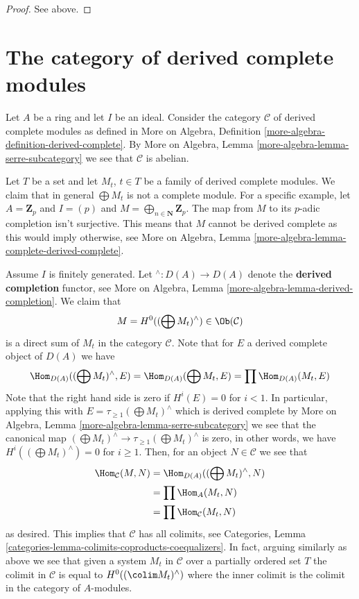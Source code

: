 \begin{proof}
See above.
\end{proof}





\section{The category of derived complete modules}
\label{section-derived-complete-modules}

\noindent
Let $A$ be a ring and let $I$ be an ideal. Consider the category
$\mathcal{C}$ of derived complete modules as defined in
More on Algebra, Definition \ref{more-algebra-definition-derived-complete}.
By More on Algebra, Lemma \ref{more-algebra-lemma-serre-subcategory}
we see that $\mathcal{C}$ is abelian.

\medskip\noindent
Let $T$ be a set and let $M_t$, $t \in T$ be a family of derived complete
modules. We claim that in general $\bigoplus M_t$ is not a complete module.
For a specific example, let $A = \mathbf{Z}_p$ and $I = (p)$ and
$M = \bigoplus_{n \in \mathbf{N}} \mathbf{Z}_p$. The map from
$M$ to its $p$-adic completion isn't surjective. This means that $M$
cannot be derived complete as this would imply otherwise, see
More on Algebra, Lemma \ref{more-algebra-lemma-complete-derived-complete}.

\medskip\noindent
Assume $I$ is finitely generated. Let ${}^\wedge : D(A) \to D(A)$ denote
the {\bf derived completion} functor, see
More on Algebra, Lemma \ref{more-algebra-lemma-derived-completion}.
We claim that
$$
M = H^0((\bigoplus M_t)^\wedge) \in \Ob(\mathcal{C})
$$
is a direct sum of $M_t$ in the category $\mathcal{C}$. Note that
for $E$ a derived complete object of $D(A)$ we have
$$
\Hom_{D(A)}((\bigoplus M_t)^\wedge, E) =
\Hom_{D(A)}(\bigoplus M_t, E) =
\prod \Hom_{D(A)}(M_t, E)
$$
Note that the right hand side is zero if $H^i(E) = 0$ for $i < 1$.
In particular, applying this with $E = \tau_{\geq 1} (\bigoplus M_t)^\wedge$
which is derived complete by
More on Algebra, Lemma \ref{more-algebra-lemma-serre-subcategory}
we see that the canonical map
$(\bigoplus M_t)^\wedge \to \tau_{\geq 1}(\bigoplus M_t)^\wedge$
is zero, in other words, we have
$H^i((\bigoplus M_t)^\wedge) = 0$ for $i \geq 1$. Then, for
an object $N \in \mathcal{C}$ we see that
\begin{align*}
\Hom_\mathcal{C}(M, N)
& =
\Hom_{D(A)}((\bigoplus M_t)^\wedge, N)\\
& =
\prod \Hom_A(M_t, N) \\
& =
\prod \Hom_\mathcal{C}(M_t, N)
\end{align*}
as desired. This implies that $\mathcal{C}$ has all colimits, see
Categories, Lemma \ref{categories-lemma-colimits-coproducts-coequalizers}.
In fact, arguing similarly as above we see that given a system $M_t$
in $\mathcal{C}$ over a partially ordered set $T$ the colimit
in $\mathcal{C}$ is equal to $H^0((\colim M_t)^\wedge)$ where the inner
colimit is the colimit in the category of $A$-modules.

